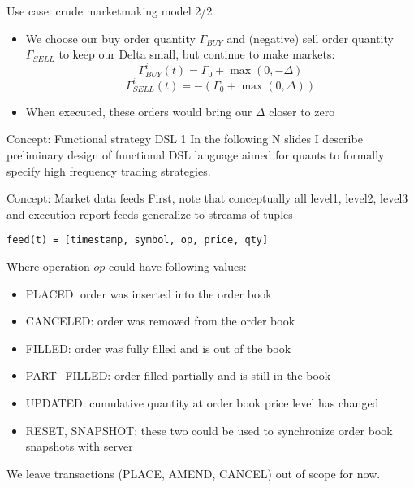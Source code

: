 \documentclass[10pt]{beamer}
\begin{document}
\begin{frame}{Use case: crude marketmaking model 2/2}
\begin{itemize}
\item We choose our buy order quantity  $\Gamma_{BUY}$ and (negative) sell order quantity $\Gamma_{SELL}$ to keep our Delta small, but continue to  make markets:
$$ \Gamma^i_{BUY}(t) = \Gamma_0+\max(0,-\Delta) $$
$$  \Gamma^i_{SELL}(t) = -(\Gamma_0+\max(0,\Delta)) $$
\item When executed, these orders would bring our $\Delta$ closer to zero
\end{itemize}
\end{frame}

\begin{frame}[fragile]{Concept: Functional strategy DSL 1}
In the following N slides I describe preliminary design of functional DSL language aimed for quants to formally specify
high frequency trading strategies.
\end{frame}
\begin{frame}[fragile]{Concept: Market data feeds}
First, note that conceptually all level1, level2, level3 and execution report feeds generalize to streams of tuples
\begin{lstlisting}
feed(t) = [timestamp, symbol, op, price, qty]
\end{lstlisting}
Where operation $op$ could have following values:
\begin{itemize}
	\item PLACED: order was inserted into the order book
	\item CANCELED: order was removed from the order book
	\item FILLED: order was fully filled and is out of the book
	\item PART\_FILLED: order filled partially and is still in the book
	\item UPDATED: cumulative quantity at order book price level has changed
	\item RESET, SNAPSHOT: these two could be used to synchronize order book snapshots with server 
\end{itemize} 
We leave transactions (PLACE, AMEND, CANCEL) out of scope for now. 
\end{frame}
\end{document}
